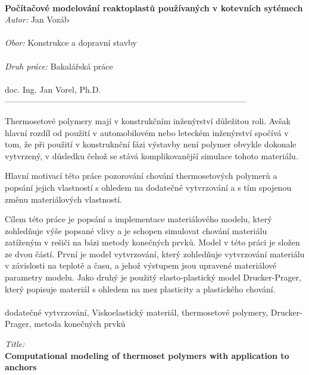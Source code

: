 \thispagestyle{empty}

\\
{\bf Počítačové modelování reaktoplastů používaných v kotevních sytémech}\\

\noindent
{\it Autor:} Jan Vozáb  \\
\\
\noindent
{\it Obor:}       Konstrukce a dopravní stavby\\
\\
\noindent
{\it Druh práce:} Bakalářská práce\\
\\
 doc. Ing. Jan Vorel, Ph.D.\\   --------------------------------------------------------------------------------------- \\


Thermosetové polymery mají v konstrukčním inženýrství důležitou roli. Avšak hlavní rozdíl od použití v automobilovém nebo leteckém inženýrství spočívá v tom, že při použití v konstruknční fázi výstavby není polymer obvykle dokonale vytvrzený, v důsledku čehož se stává komplikovanější simulace tohoto materiálu.

Hlavní motivací této práce pozorování chování thermosetových polymerů a popsání jejich vlastností s ohledem na dodatečné vytvrzování a s tím spojenou změnu materiálových vlastností. 

Cílem této práce je popsání a implementace materiálového modelu, který zohledňuje výše popsané vlivy a je schopen simulovat chování materiálu zatíženým v rešiči na bázi metody konečných prvků. Model v této práci je složen ze dvou částí. První je model vytvrzování, který zohledňuje vytvrzování materiálu v závislosti na teplotě a času, a jehož výstupem jsou upravené materiálové parametry modelu. Jako druhý je použitý elasto-plastický model Drucker-Prager, který popisuje materiál s ohledem na mez plasticity a plastického chování. 
\\
\\

 dodatečné vytvrzování, Viskoelastický materiál, thermosetové polymery, Drucker-Prager, metoda konečných prvků

 \newpage
\thispagestyle{empty}
 \noindent
{\it Title:}\\
{\bf Computational modeling of thermoset polymers with application to anchors}\\

